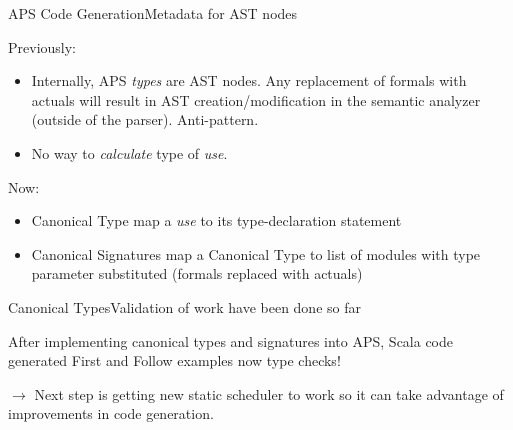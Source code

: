 \begin{frame}[fragile=singleslide]{APS Code Generation}{Metadata for AST nodes}

Previously:

\begin{itemize}
    \item Internally, APS \emph{types} are AST nodes. Any replacement of formals with actuals will result in AST creation/modification in the semantic analyzer (outside of the parser). \alert{Anti-pattern}.
    \item No way to \emph{calculate} type of \emph{use}.
\end{itemize}

Now:

\begin{itemize}
    \item \alert{Canonical Type} map a \emph{use} to its type-declaration statement
    \item \alert{Canonical Signatures} map a \alert{Canonical Type} to list of modules with type parameter \alert{substituted} (formals replaced with actuals)
\end{itemize}

\end{frame}




\begin{frame}{Canonical Types}{Validation of work have been done so far}
    
After implementing canonical types and signatures into APS, Scala code generated First and Follow examples \alert{now type checks}!

\newlinevspace

$\to$ Next step is getting new \alert{static scheduler} to work so it can take advantage of improvements in code generation.

\end{frame}

